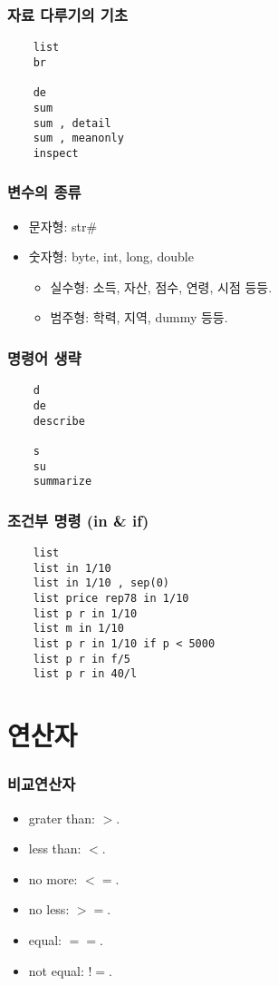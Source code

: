 \documentclass[aspectratio=169,xcolor=dvipsnames,handout]{beamer}
\begin{document}
\begin{frame}[fragile]
    \frametitle{자료 다루기의 기초}
    \begin{verbatim}
    list
    br
    
    de
    sum
    sum , detail
    sum , meanonly
    inspect
    \end{verbatim}
\end{frame}

\begin{frame}[allowframebreaks]
    \frametitle{변수의 종류}
    \begin{itemize}[<+->]
        \item 문자형: str\#
        \item 숫자형: byte, int, long, double
        \begin{itemize}[<+->]
            \item 실수형: 소득, 자산, 점수, 연령, 시점 등등.
            \item 범주형: 학력, 지역, dummy 등등.
        \end{itemize}
    \end{itemize}
\end{frame}

\begin{frame}[fragile]
    \frametitle{명령어 생략}
    \begin{verbatim}
    d
    de
    describe

    s
    su
    summarize
    \end{verbatim}
\end{frame}

\begin{frame}[fragile]
    \frametitle{조건부 명령 (in \& if)}
    \begin{verbatim}
    list
    list in 1/10
    list in 1/10 , sep(0)
    list price rep78 in 1/10
    list p r in 1/10
    list m in 1/10
    list p r in 1/10 if p < 5000
    list p r in f/5
    list p r in 40/l
    \end{verbatim}
\end{frame}

\section{연산자}

\begin{frame}[allowframebreaks]
    \frametitle{비교연산자}
    \begin{itemize}[<+->]
        \item grater than: $>$.
        \item less than: $<$.
        \item no more: $<=$.
        \item no less: $>=$.
        \item equal: $==$.
        \item not equal: $!=$.
    \end{itemize}
\end{frame}
\end{document}
